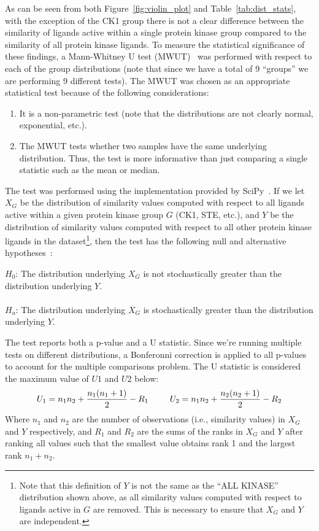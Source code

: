 \documentclass[11pt]{article}
\begin{document}
As can be seen from both Figure~\ref{fig:violin_plot} and Table~\ref{tab:dist_stats}, with the exception of the CK1 group there is not a clear difference between the similarity of ligands active within a single protein kinase group compared to the similarity of all protein kinase ligands. 
To measure the statistical significance of these findings, a Mann-Whitney U test (MWUT)~\cite{mann_whitney_1947} was performed with respect to each of the group distributions (note that since we have a total of 9 ``groups'' we are performing 9 different tests). 
The MWUT was chosen as an appropriate statistical test because of the following considerations:
\begin{enumerate}
    \item It is a non-parametric test (note that the distributions are not clearly normal, exponential, etc.).
    \item The MWUT tests whether two samples have the same underlying distribution. Thus, the test is more informative than just comparing a single statistic such as the mean or median. 
\end{enumerate}
The test was performed using the implementation provided by SciPy~\cite{scipy_2020,scipy_manual_2025}. 
If we let $X_G$ be the distribution of similarity values computed with respect to all ligands active within a given protein kinase group $G$ (CK1, STE, etc.), and $Y$ be the distribution of similarity values computed with respect to all other protein kinase ligands in the dataset\footnote{Note that this definition of $Y$ is not the same as the ``ALL KINASE'' distribution shown above, as all similarity values computed with respect to ligands active in $G$ are removed. This is necessary to ensure that $X_G$ and $Y$ are independent.}, then the test has the following null and alternative hypotheses~\cite{scipy_manual_2025}:\\
\begin{adjustwidth}{2.5em}{0pt}
$H_0$: The distribution underlying $X_G$ is not stochastically greater than the distribution underlying $Y$.\\\\
$H_a$: The distribution underlying $X_G$ is stochastically greater than the distribution underlying $Y$.\\
\end{adjustwidth}
\noindent
The test reports both a p-value and a U statistic. Since we're running multiple tests on different distributions, a Bonferonni correction is applied to all p-values to account for the multiple comparisons problem. 
The U statistic is considered the maximum value of $U1$ and $U2$ below:
\begin{equation}
U_1 = n_1n_2 + \frac{n_1(n_1+1)}{2}- R_1 \;\;\;\;\;\;\;\;\; U_2 = n_1n_2 + \frac{n_2(n_2+1)}{2}- R_2 \\
\end{equation}
Where $n_1$ and $n_2$ are the number of observations (i.e., similarity values) in $X_G$ and $Y$ respectively, and $R_1$ and $R_2$ are the sums of the ranks in $X_G$ and $Y$ after ranking all values such that the smallest value obtains rank 1 and the largest rank $n_1 + n_2$. 
\end{document}
